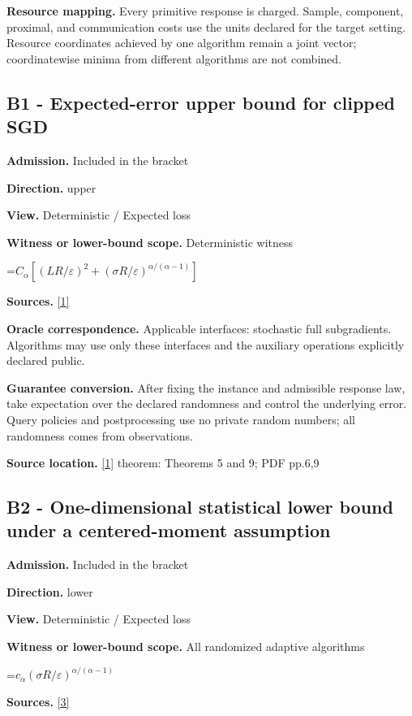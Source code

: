\documentclass[10pt,a4paper]{article}
\newcommand{\AtlasMath}[1]{\par\begingroup\centering\setbox0=\hbox{$\displaystyle #1$}\ifdim\wd0>1.4\linewidth\typeout{ATLAS WIDE FORMULA: \the\wd0}\fi\ifdim\wd0>\linewidth\resizebox{\linewidth}{!}{\box0}\else\box0\fi\par\endgroup}
\begin{document}
\textbf{Resource mapping.} Every primitive response is charged. Sample, component, proximal, and communication costs use the units declared for the target setting. Resource coordinates achieved by one algorithm remain a joint vector; coordinatewise minima from different algorithms are not combined.

\subsection{B1 - Expected-error upper bound for clipped SGD}
\textbf{Admission.} Included in the bracket

\textbf{Direction.} upper

\textbf{View.} Deterministic / Expected loss

\textbf{Witness or lower-bound scope.} Deterministic witness

\AtlasMath{C_\alpha[(LR/\varepsilon)^2+(\sigma R/\varepsilon)^{\alpha/(\alpha-1)}]}
\textbf{Sources.} \href{https://arxiv.org/pdf/2303.12277}{[1]}

\textbf{Oracle correspondence.} Applicable interfaces: stochastic full subgradients. Algorithms may use only these interfaces and the auxiliary operations explicitly declared public.

\textbf{Guarantee conversion.} After fixing the instance and admissible response law, take expectation over the declared randomness and control the underlying error. Query policies and postprocessing use no private random numbers; all randomness comes from observations.

\textbf{Source location.} \href{https://arxiv.org/pdf/2303.12277}{[1]} theorem: Theorems 5 and 9; PDF pp.6,9

\subsection{B2 - One-dimensional statistical lower bound under a centered-moment assumption}
\textbf{Admission.} Included in the bracket

\textbf{Direction.} lower

\textbf{View.} Deterministic / Expected loss

\textbf{Witness or lower-bound scope.} All randomized adaptive algorithms

\AtlasMath{c_\alpha (\sigma R/\varepsilon)^{\alpha/(\alpha-1)}}
\textbf{Sources.} \href{https://arxiv.org/pdf/2609.10874}{[3]}
\end{document}
